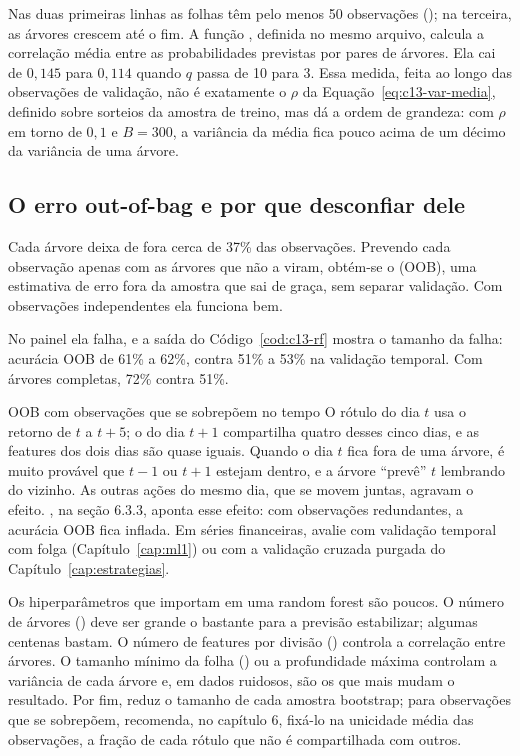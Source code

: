 Nas duas primeiras linhas as folhas têm pelo menos 50 observações (); na terceira, as árvores crescem até o fim. A função , definida no mesmo arquivo, calcula a correlação média entre as probabilidades previstas por pares de árvores. Ela cai de $0,145$ para $0,114$ quando $q$ passa de 10 para 3. Essa medida, feita ao longo das observações de validação, não é exatamente o $\rho$ da Equação~\eqref{eq:c13-var-media}, definido sobre sorteios da amostra de treino, mas dá a ordem de grandeza: com $\rho$ em torno de $0,1$ e $B = 300$, a variância da média fica pouco acima de um décimo da variância de uma árvore.

\subsection{O erro out-of-bag e por que desconfiar dele}

Cada árvore deixa de fora cerca de 37\% das observações. Prevendo cada observação apenas com as árvores que não a viram, obtém-se o  (OOB), uma estimativa de erro fora da amostra que sai de graça, sem separar validação. Com observações independentes ela funciona bem.

No painel ela falha, e a saída do Código~\ref{cod:c13-rf} mostra o tamanho da falha: acurácia OOB de 61\% a 62\%, contra 51\% a 53\% na validação temporal. Com árvores completas, 72\% contra 51\%.

\begin{armadilha}{OOB com observações que se sobrepõem no tempo}
O rótulo do dia $t$ usa o retorno de $t$ a $t+5$; o do dia $t+1$ compartilha quatro desses cinco dias, e as features dos dois dias são quase iguais. Quando o dia $t$ fica fora de uma árvore, é muito provável que $t-1$ ou $t+1$ estejam dentro, e a árvore ``prevê'' $t$ lembrando do vizinho. As outras ações do mesmo dia, que se movem juntas, agravam o efeito. \citet{lopezdeprado2018}, na seção 6.3.3, aponta esse efeito: com observações redundantes, a acurácia OOB fica inflada. Em séries financeiras, avalie com validação temporal com folga (Capítulo~\ref{cap:ml1}) ou com a validação cruzada purgada do Capítulo~\ref{cap:estrategias}.
\end{armadilha}

Os hiperparâmetros que importam em uma random forest são poucos. O número de árvores () deve ser grande o bastante para a previsão estabilizar; algumas centenas bastam. O número de features por divisão () controla a correlação entre árvores. O tamanho mínimo da folha () ou a profundidade máxima controlam a variância de cada árvore e, em dados ruidosos, são os que mais mudam o resultado. Por fim,  reduz o tamanho de cada amostra bootstrap; para observações que se sobrepõem, \citet{lopezdeprado2018} recomenda, no capítulo 6, fixá-lo na unicidade média das observações, a fração de cada rótulo que não é compartilhada com outros.

